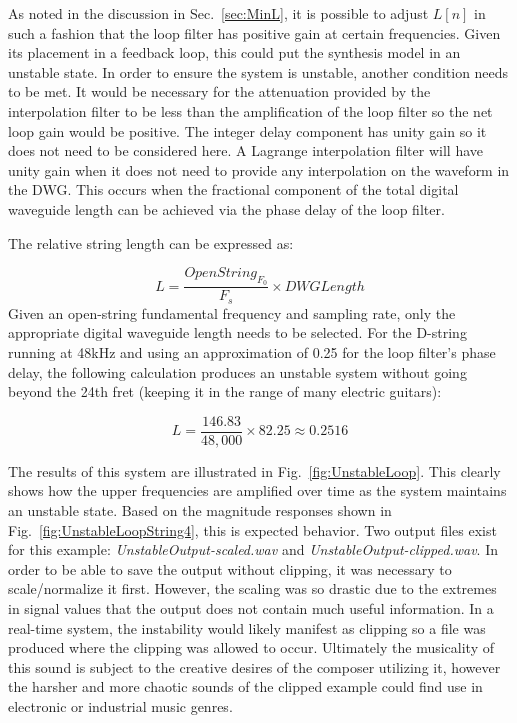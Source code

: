 \documentclass[../main.tex]{subfiles}
\begin{document}
As noted in the discussion in Sec.~\ref{sec:MinL}, it is possible to adjust $L[n]$ in such a fashion that the loop filter has positive gain at certain frequencies. Given its placement in a feedback loop, this could put the synthesis model in an unstable state. In order to ensure the system is unstable, another condition needs to be met. It would be necessary for the attenuation provided by the interpolation filter to be less than the amplification of the loop filter so the net loop gain would be positive. The integer delay component has unity gain so it does not need to be considered here. A Lagrange interpolation filter will have unity gain when it does not need to provide any interpolation on the waveform in the DWG. This occurs when the fractional component of the total digital waveguide length can be achieved via the phase delay of the loop filter.

The relative string length can be expressed as:

\begin{equation}
    L = \frac{OpenString_{F_0}}{F_s} \times DWGLength    
\end{equation}
Given an open-string fundamental frequency and sampling rate, only the appropriate digital waveguide length needs to be selected. For the D-string running at 48kHz and using an approximation of 0.25 for the loop filter's phase delay, the following calculation produces an unstable system without going beyond the 24th fret (keeping it in the range of many electric guitars):

\begin{equation}
\label{eq:LUnstable}
    L = \frac{146.83}{48,000} \times 82.25 \approx 0.2516
\end{equation}

The results of this system are illustrated in Fig.~\ref{fig:UnstableLoop}. This clearly shows how the upper frequencies are amplified over time as the system maintains an unstable state. Based on the magnitude responses shown in Fig.~\ref{fig:UnstableLoopString4}, this is expected behavior. Two output files exist for this example: \emph{UnstableOutput-scaled.wav} and \emph{UnstableOutput-clipped.wav}. In order to be able to save the output without clipping, it was necessary to scale/normalize it first. However, the scaling was so drastic due to the extremes in signal values that the output does not contain much useful information. In a real-time system, the instability would likely manifest as clipping so a file was produced where the clipping was allowed to occur. Ultimately the musicality of this sound is subject to the creative desires of the composer utilizing it, however the harsher and more chaotic sounds of the clipped example could find use in electronic or industrial music genres.
\end{document}
